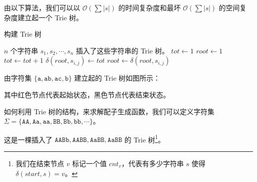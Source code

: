 \documentclass[12pt]{article} %
\begin{document}
由以下算法，我们可以以 $\mathcal O(\sum |s|)$ 的时间复杂度和最坏 $\mathcal O(\sum |s|)$ 的空间复杂度建立起一个 Trie 树。

\begin{algorithm}
	\caption{构建 Trie 树}
	\begin{algorithmic}[1]
		\Require $n$ 个字符串 $s_1,s_2,\cdots,s_n$
		\Ensure 插入了这些字符串的 Trie 树。
		\State $tot \gets 1$
			\State $root \gets 1$
					\State $tot \gets tot+1$
					\State $\delta(root,s_{i,j}) \gets tot$
				\EndIf
				\State $root \gets \delta(root,s_{i,j})$
			\EndFor
		\EndFor
		\State {}
		\EndFunction
	\end{algorithmic}
\end{algorithm}

由字符集 $\{\texttt{a},\texttt{ab},\texttt{ac},\texttt{b}\}$ 建立起的 Trie 树如图所示：

\begin{center}
\end{center}

其中红色节点代表起始状态，黑色节点代表结束状态。

\newpage

如何利用 Trie 树的结构，来求解配子生成函数，我们可以定义字符集 $\Sigma=\{\texttt{AA},\texttt{Aa},\texttt{aa},\texttt{BB},\texttt{Bb},\texttt{bb},\cdots\}$。

这是一棵插入了 $\texttt{AABb},\texttt{AABB},\texttt{AaBB},\texttt{AaBB}$ 的 Trie 树\footnote{我们在结束节点 $v$ 标记一个值 $cnt_v$，代表有多少字符串 $s$ 使得 $\delta(start,s)=v$。}。
\end{document}
